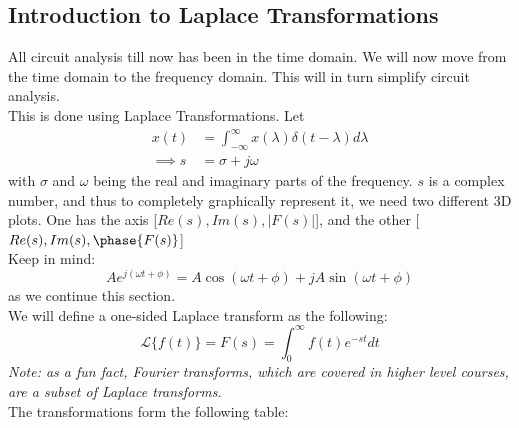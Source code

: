 \documentclass[nobib]{tufte-handout}
\begin{document}
\subsection{Introduction to Laplace Transformations}
All circuit analysis till now has been in the time domain. We will now move
from the time domain to the frequency domain. This will in turn simplify
circuit analysis.\\ This is done using Laplace Transformations. Let
\begin{align*}
    x(t)       & = \int_{-\infty}^{\infty} x(\lambda)\delta(t-\lambda)d\lambda \\
    \implies s & = \sigma +j\omega
\end{align*}
with $\sigma$ and $\omega$ being the real and imaginary parts of the frequency.
$s$ is a complex number, and thus to completely graphically represent it, we need two different 3D plots. One has the axis [$Re(s),Im(s),|F(s)|$], and the other [$Re(s),Im(s),\phase{F(s)}$]\\
Keep in mind:
\begin{equation*}
    Ae^{j(\omega t+\phi)} = A\cos(\omega t+\phi)+jA\sin(\omega t+ \phi)
\end{equation*}
as we continue this section.\\
We will define a one-sided Laplace transform as the following:
\begin{equation*}
    \mathcal{L}\{f(t)\} = F(s) = \int_{0}^{\infty} f(t)e^{-st}dt
\end{equation*}
\textit{Note: as a fun fact, Fourier transforms, which are covered in higher level courses, are a subset of Laplace transforms.}\\
The transformations form the following table:
\end{document}
